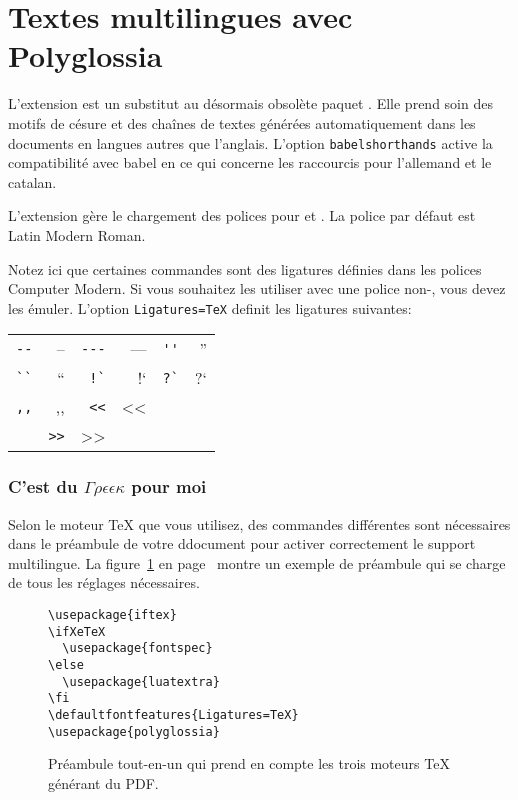 \section{Textes multilingues avec Polyglossia}
%
L'extension \cite{polyglossia} est un substitut au désormais obsolète paquet
. Elle prend soin des motifs de césure et des chaînes de
textes générées automatiquement dans les documents en langues autres que l'anglais. L'option \verb|babelshorthands|
active la compatibilité avec babel en ce qui concerne les raccourcis
pour l'allemand et le catalan.

L'extension \cite{fontspec} gère le chargement des
polices pour  et . La police par défaut
est Latin Modern Roman.

Notez ici
que certaines commandes  sont des ligatures définies dans
les polices Computer Modern. Si vous souhaitez les utiliser avec une
police non-, vous devez les émuler. L'option
\texttt{Ligatures=TeX} definit les ligatures suivantes:

\begin{tabular}{rr@{~~~~}rr@{~~~~}rr}
\verb|--|	& -- & \verb|---|	& --- & \verb|''|	& ''\\
\verb|``|	& `` & \verb|!`|	& !`  &  \verb|?`|	& ?`\\
\verb|,,|	& ,, & \verb|<<|	& <<\\ & \verb|>>|	& >>\\
\end{tabular}


\subsubsection{C'est du $\Gamma\rho\epsilon\epsilon\kappa$ pour moi}

Selon le moteur \TeX{} que vous utilisez, des commandes différentes
sont nécessaires dans le préambule de votre ddocument pour activer
correctement le support multilingue.
La figure~\ref{allinone} en page~\pageref{allinone} montre un exemple
de préambule qui se charge de tous les réglages nécessaires.

\begin{figure}[!bp]
\begin{lined}{10cm}
\begin{verbatim}
\usepackage{iftex}
\ifXeTeX
  \usepackage{fontspec}
\else
  \usepackage{luatextra}
\fi
\defaultfontfeatures{Ligatures=TeX}
\usepackage{polyglossia}
\end{verbatim}
\end{lined}
\caption[Préambule tout-en-un]{Préambule tout-en-un qui prend en compte les trois moteurs \TeX{} générant du PDF.} \label{allinone}
\end{figure}


